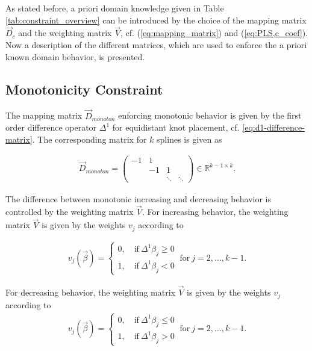 \documentclass[10pt,a4paper]{report}
\begin{document}
As stated before, a priori domain knowledge given in Table \ref{tab:constraint_overview} can be introduced by the choice of the mapping matrix $\vec{D}_c$ and the weighting matrix $\vec{V}$, cf. (\ref{eq:mapping_matrix}) and (\ref{eq:PLS,c_coef}). Now a description of the different matrices, which are used to enforce the a priori known domain behavior, is presented. 

\subsection{Monotonicity Constraint}

The mapping matrix $\vec{D}_{monoton}$ enforcing monotonic behavior is given by the first order difference operator $\Delta^1$ for equidistant knot placement, cf. \ref{eq:d1-difference-matrix}. The corresponding matrix for $k$ splines is given as

\begin{align} \label{eq:D_c_monoton}
	\vec{D}_{monoton} = \begin{pmatrix}  -1 & 1  &  		& \\ 
		& -1 & 1 		& \\ 
		&    & \ddots  & \ddots  
	\end{pmatrix} \in \mathbb{R}^{k-1 \times k}.
\end{align}

The difference between monotonic increasing and decreasing behavior is controlled by the weighting matrix $\vec{V}$. For increasing behavior, the weighting matrix $\vec{V}$ is given by the weights $v_j$ according to

\begin{align} \label{eq:v_monoton_inc}
	v_j(\vec{\beta}) = \begin{cases}
			0, \quad \text{if} \ \Delta^1\beta_j \ge 0 \\ 
			1, \quad \text{if} \ \Delta^1\beta_j < 0
	\end{cases}	\ \text{for} \ j=2, \dots, k-1.
\end{align}

For decreasing behavior, the weighting matrix $\vec{V}$ is given by the weights $v_j$ according to
\begin{align} \label{eq:v_monoton_dec}
	v_j(\vec{\beta}) = \begin{cases} 0, \quad \text{if} \ \Delta^1\beta_j \le 0 \\ 
		1, \quad \text{if} \ \Delta^1\beta_j > 0
	\end{cases} \ \text{for} \ j=2, \dots, k-1.
\end{align}
\end{document}
